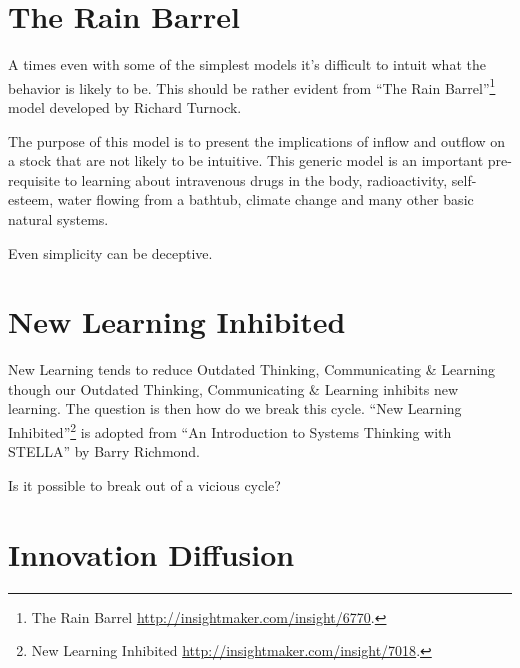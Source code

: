 \documentclass[]{memoir}
\begin{document}
\section{The Rain Barrel}

A times even with some of the simplest models it's difficult to intuit
what the behavior is likely to be. This should be rather evident from
``The Rain Barrel''\footnote{The Rain Barrel
  \url{http://insightmaker.com/insight/6770}.} model developed by
Richard Turnock.

The purpose of this model is to present the implications of inflow and
outflow on a stock that are not likely to be intuitive. This generic
model is an important pre-requisite to learning about intravenous drugs
in the body, radioactivity, self-esteem, water flowing from a bathtub,
climate change and many other basic natural systems.

\FloatBarrier 

\begin{model}[frametitle={Model: The Rain Barrel}] 

 Even simplicity can be deceptive.




 \end{model}

\section{New Learning Inhibited}

New Learning tends to reduce Outdated Thinking, Communicating \&
Learning though our Outdated Thinking, Communicating \& Learning
inhibits new learning. The question is then how do we break this cycle.
``New Learning Inhibited''\footnote{New Learning Inhibited
  \url{http://insightmaker.com/insight/7018}.} is adopted from ``An
Introduction to Systems Thinking with STELLA'' by Barry Richmond.

\FloatBarrier 

\begin{model}[frametitle={Model: New Learning Inhibited}] 

 Is it possible to break out of a vicious cycle?




 \end{model}

\section{Innovation Diffusion}
\end{document}
